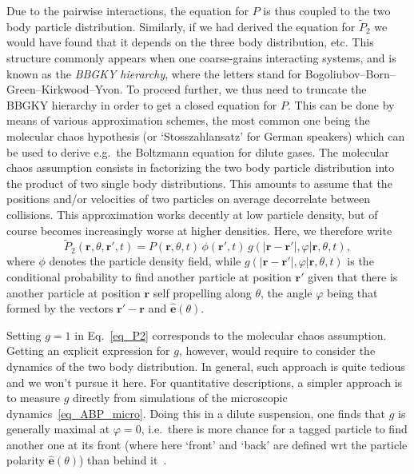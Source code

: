 Due to the pairwise interactions, the equation for $P$ is thus coupled to the two body particle distribution. Similarly, if we had derived the equation for $\tilde{P}_2$ we would have found that it depends on the three body distribution, etc. 
This structure commonly appears when one coarse-grains interacting systems, and is known as the \emph{BBGKY hierarchy}, where the letters stand for Bogoliubov–Born–Green–Kirkwood–Yvon. To proceed further, we thus need to truncate the BBGKY hierarchy in order to get a closed equation for $P$. This can be done by means of various approximation schemes, the most common one being the molecular chaos hypothesis (or `Stosszahlansatz' for German speakers) which can be used to derive e.g.\ the Boltzmann equation for dilute gases. The molecular chaos assumption consists in factorizing the two body particle distribution into the product of two single body distributions.    
This amounts to assume that the positions and/or velocities of two particles on average decorrelate between collisions. This approximation works decently at low particle density, but of course becomes increasingly worse at higher densities.
Here, we therefore write
\begin{equation} \label{eq_P2}
    \tilde{P}_2(\bm r,\theta,\bm r',t) = P(\bm r,\theta,t) \, \phi(\bm r',t) \, g(|\bm r - \bm r'|,\varphi|\bm r,\theta,t),
\end{equation}
where $\phi$ denotes the particle density field, while $g(|\bm r - \bm r'|,\varphi|\bm r,\theta,t)$ 
is the conditional probability to find another 
particle at position $\bm r'$ given that there is another particle at position $\bm r$ self propelling along $\theta$, the angle $\varphi$ being that formed by the vectors $\bm r' - \bm r$ and $\hat{\bm e}(\theta)$.

Setting $g=1$ in Eq.~\eqref{eq_P2} corresponds to the molecular chaos assumption. 
Getting an explicit expression for $g$, however, would require to consider the dynamics of the two body distribution. In general, such approach is quite tedious and we won't pursue it here.
For quantitative descriptions, a simpler approach is to measure $g$ directly from simulations of the microscopic dynamics~\eqref{eq_ABP_micro}. 
Doing this in a dilute suspension, one finds that $g$ is generally maximal 
at $\varphi = 0$, i.e.\ there is more chance for a tagged particle to find another one at its front (where here `front' and `back' are defined wrt the particle polarity $\hat{\bm e}(\theta)$) than behind it~\cite{Bialk_2013}.

